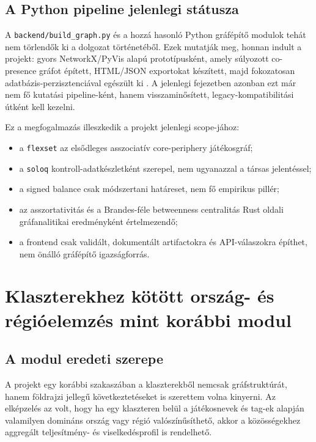 ﻿\documentclass[a4paper,12pt]{report}
\begin{document}
\section{A Python pipeline jelenlegi státusza}

A \texttt{backend/build\_graph.py} és a hozzá hasonló Python gráfépítő modulok tehát nem törlendők ki a dolgozat történetéből. Ezek mutatják meg, honnan indult a projekt: gyors NetworkX/PyVis alapú prototípusként, amely súlyozott co-presence gráfot épített, HTML/JSON exportokat készített, majd fokozatosan adatbázis-perzisztenciával egészült ki \cite{networkx_greedy,pyvis}. A jelenlegi fejezetben azonban ezt már nem fő kutatási pipeline-ként, hanem visszaminősített, legacy-kompatibilitási útként kell kezelni.

Ez a megfogalmazás illeszkedik a projekt jelenlegi scope-jához:

\begin{itemize}
    \item a \texttt{flexset} az elsődleges asszociatív core-periphery játékosgráf;
    \item a \texttt{soloq} kontroll-adatkészletként szerepel, nem ugyanazzal a társas jelentéssel;
    \item a signed balance csak módszertani határeset, nem fő empirikus pillér;
    \item az asszortativitás és a Brandes-féle betweenness centralitás Rust oldali gráfanalitikai eredményként értelmezendő;
    \item a frontend csak validált, dokumentált artifactokra és API-válaszokra építhet, nem önálló gráfépítő igazságforrás.
\end{itemize}

\chapter{Klaszterekhez kötött ország- és régióelemzés mint korábbi modul}

\section{A modul eredeti szerepe}

A projekt egy korábbi szakaszában a klaszterekből nemcsak gráfstruktúrát, hanem földrajzi jellegű következtetéseket is szerettem volna kinyerni. Az elképzelés az volt, hogy ha egy klaszteren belül a játékosnevek és tag-ek alapján valamilyen domináns ország vagy régió valószínűsíthető, akkor a közösségekhez aggregált teljesítmény- és viselkedésprofil is rendelhető.
\end{document}
